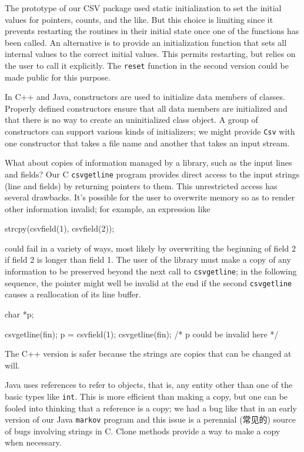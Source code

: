 The prototype of our CSV package used static initialization to set the
initial values for pointers, counts, and the like. But this choice is
limiting since it prevents restarting the routines in their initial state
once one of the functions has been called. An alternative is to provide an
initialization function that sets all internal values to the correct
initial values. This permits restarting, but relies on the user to call it
explicitly. The \verb'reset' function in the second version could be made
public for this purpose.

In C++ and Java, constructors are used to initialize data members of
classes.  Properly defined constructors ensure that all data members are
initialized and that there is no way to create an uninitialized class
object. A group of constructors can support various kinds of initializers;
we might provide \verb'Csv' with one constructor that takes a file name and
another that takes an input stream.

What about copies of information managed by a library, such as the input
lines
and fields? Our C \verb'csvgetline' program provides direct access to the input
strings
(line and fields) by returning pointers to them. This unrestricted access
has several
drawbacks. It's possible for the user to overwrite memory so as to render
other information invalid; for example, an expression like
\begin{wellcode}
    strcpy(csvfield(1), csvfield(2));
\end{wellcode}
could fail in a variety of ways, most likely by overwriting the beginning
of field 2 if field 2 is longer than field 1. The user of the library must
make a copy of any information to be preserved beyond the next call to
\verb'csvgetline'; in the following sequence, the pointer might well be
invalid at the end if the second \verb'csvgetline' causes a reallocation of
its line buffer.
\begin{wellcode}
    char    *p;

    csvgetline(fin);
    p = csvfield(1);
    csvgetline(fin);
    /* p could be invalid here */
\end{wellcode}
The C++ version is safer because the strings are copies that can be changed
at will.

Java uses references to refer to objects, that is, any entity other than
one of the basic types like \verb'int'. This is more efficient than making
a copy, but one can be fooled into thinking that a reference is a copy; we
had a bug like that in an early version of our Java \verb'markov' program
and this issue is a perennial (常见的) source of bugs involving strings in
C. Clone methods provide a way to make a copy when necessary.

